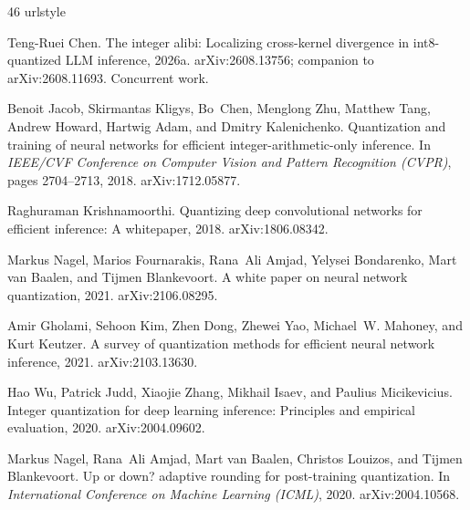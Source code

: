 \documentclass[11pt]{article}
\begin{document}
\begin{thebibliography}{46}
\providecommand{\natexlab}[1]{#1}
\providecommand{\url}[1]{\texttt{#1}}
\expandafter\ifx\csname urlstyle\endcsname\relax
  \providecommand{\doi}[1]{doi: #1}\else
  \providecommand{\doi}{doi: \begingroup \urlstyle{rm}\Url}\fi

\bibitem[Chen(2026{\natexlab{a}})]{chen2026integeralibi}
Teng-Ruei Chen.
\newblock The integer alibi: Localizing cross-kernel divergence in int8-quantized {LLM} inference, 2026{\natexlab{a}}.
\newblock arXiv:2608.13756; companion to arXiv:2608.11693. Concurrent work.

Benoit Jacob, Skirmantas Kligys, Bo~Chen, Menglong Zhu, Matthew Tang, Andrew Howard, Hartwig Adam, and Dmitry Kalenichenko.
\newblock Quantization and training of neural networks for efficient integer-arithmetic-only inference.
\newblock In \emph{IEEE/CVF Conference on Computer Vision and Pattern Recognition (CVPR)}, pages 2704--2713, 2018.
\newblock arXiv:1712.05877.

Raghuraman Krishnamoorthi.
\newblock Quantizing deep convolutional networks for efficient inference: A whitepaper, 2018.
\newblock arXiv:1806.08342.

Markus Nagel, Marios Fournarakis, Rana~Ali Amjad, Yelysei Bondarenko, Mart van Baalen, and Tijmen Blankevoort.
\newblock A white paper on neural network quantization, 2021.
\newblock arXiv:2106.08295.

Amir Gholami, Sehoon Kim, Zhen Dong, Zhewei Yao, Michael~W. Mahoney, and Kurt Keutzer.
\newblock A survey of quantization methods for efficient neural network inference, 2021.
\newblock arXiv:2103.13630.

Hao Wu, Patrick Judd, Xiaojie Zhang, Mikhail Isaev, and Paulius Micikevicius.
\newblock Integer quantization for deep learning inference: Principles and empirical evaluation, 2020.
\newblock arXiv:2004.09602.

Markus Nagel, Rana~Ali Amjad, Mart van Baalen, Christos Louizos, and Tijmen Blankevoort.
\newblock Up or down? adaptive rounding for post-training quantization.
\newblock In \emph{International Conference on Machine Learning (ICML)}, 2020.
\newblock arXiv:2004.10568.


\end{thebibliography}
\end{document}
